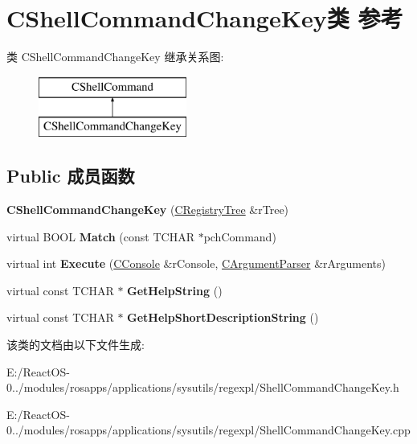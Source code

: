 \hypertarget{class_c_shell_command_change_key}{}\section{C\+Shell\+Command\+Change\+Key类 参考}
\label{class_c_shell_command_change_key}
类 C\+Shell\+Command\+Change\+Key 继承关系图\+:\begin{figure}[H]
\begin{center}
\leavevmode
\includegraphics[height=2.000000cm]{class_c_shell_command_change_key}
\end{center}
\end{figure}
\subsection*{Public 成员函数}
\begin{DoxyCompactItemize}
\item 
\mbox{\label{class_c_shell_command_change_key_ac19484d559a4c2400f8cb7400d0065f2}} 
{\bfseries C\+Shell\+Command\+Change\+Key} (\hyperlink{class_c_registry_tree}{C\+Registry\+Tree} \&r\+Tree)
\item 
\mbox{\label{class_c_shell_command_change_key_aa449ba62f4130f9a1bf685444f5e23e9}} 
virtual B\+O\+OL {\bfseries Match} (const T\+C\+H\+AR $\ast$pch\+Command)
\item 
\mbox{\label{class_c_shell_command_change_key_ac70134b165734b74e0eb66385ffcc8bb}} 
virtual int {\bfseries Execute} (\hyperlink{class_c_console}{C\+Console} \&r\+Console, \hyperlink{class_c_argument_parser}{C\+Argument\+Parser} \&r\+Arguments)
\item 
\mbox{\label{class_c_shell_command_change_key_a5b46ad48f3c2427bee01c53af29ace33}} 
virtual const T\+C\+H\+AR $\ast$ {\bfseries Get\+Help\+String} ()
\item 
\mbox{\label{class_c_shell_command_change_key_ae0174a6a5cfce2ddcf6585021a2cb9d8}} 
virtual const T\+C\+H\+AR $\ast$ {\bfseries Get\+Help\+Short\+Description\+String} ()
\end{DoxyCompactItemize}


该类的文档由以下文件生成\+:\begin{DoxyCompactItemize}
\item 
E\+:/\+React\+O\+S-\/0../modules/rosapps/applications/sysutils/regexpl/Shell\+Command\+Change\+Key.\+h\item 
E\+:/\+React\+O\+S-\/0../modules/rosapps/applications/sysutils/regexpl/Shell\+Command\+Change\+Key.\+cpp\end{DoxyCompactItemize}
